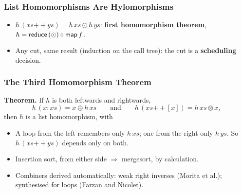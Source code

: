 \begin{frame*}[vertical-alignment = top]
  \frametitle{List Homomorphisms Are Hylomorphisms}
  \vspace*{3mm}
  \begin{itemize}
    \item<2-> $h\,(xs \mathbin{+\!\!+} ys) = h\,xs \odot h\,ys$:
      \textbf{first homomorphism theorem}, $h = \mathsf{reduce}\,(\odot) \circ
      \mathsf{map}\,f$.
    \item<3-> Any cut, same result (induction on the call tree): the cut
      is a \textbf{scheduling} decision.
  \end{itemize}
\end{frame*}

\begin{frame*}[vertical-alignment = top]
  \frametitle{The Third Homomorphism Theorem}
  \vspace*{3mm}
  \textbf{Theorem.} If $h$ is both leftwards and rightwards,
  \[ h\,(x : xs) = x \oplus h\,xs \qquad\text{and}\qquad
     h\,(xs \mathbin{+\!\!+} [x]) = h\,xs \otimes x, \]
  then $h$ is a list homomorphism, with
  \begin{itemize}
    \item<2-> A loop from the left remembers only $h\,xs$; one from the
      right only $h\,ys$. So $h\,(xs \mathbin{+\!\!+} ys)$ depends only on
      both.
    \item<3-> Insertion sort, from either side $\Longrightarrow$ mergesort,
      by calculation.
    \item<4-> Combiners derived automatically: weak right inverses (Morita
      et al.); synthesised for loops (Farzan and Nicolet).
  \end{itemize}
\end{frame*}


